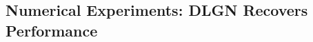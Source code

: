 \subsection{Numerical Experiments: DLGN Recovers Performance}\label{sec:dlgn}
\begin{comment}
\begin{figure}[!b]
\centering
\begin{minipage}{0.95\columnwidth}
\centering
\resizebox{0.99\columnwidth}{!}{

}
\end{minipage}
\caption{\small{Here the gates $G_1,G_2,G_3,G_4$ are generated by the feature network are are permuted as $G_{i_1},G_{i_2},G_{i_3},G_{i_4}$ before applying to the value network. All convolutional layers have $128$ filters each.}}
\label{fig:c4gap}
\end{figure}
\end{comment}
